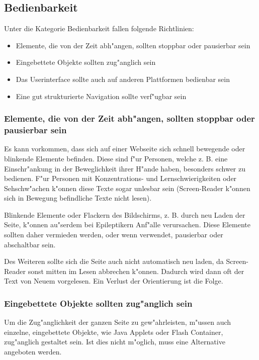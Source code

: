 \documentclass[a4paper,bibtotoc,oneside]{scrbook}
\begin{document}
\subsection{Bedienbarkeit}
Unter die Kategorie Bedienbarkeit fallen folgende Richtlinien: 

\begin{itemize}
\item Elemente, die von der Zeit abh"angen, sollten stoppbar oder pausierbar sein \cite[Abschnitt 6.7]{wcag1}
\item Eingebettete Objekte sollten zug"anglich sein\cite[Abschnitt 6.8]{wcag1}
\item Das Userinterface sollte auch auf anderen Plattformen bedienbar sein\cite[Abschnitt 6.9]{wcag1}
\item Eine gut strukturierte Navigation sollte verf"ugbar sein\cite[Abschnitt 6.13]{wcag1}
\end{itemize}

\subsubsection{Elemente, die von der Zeit abh"angen, sollten stoppbar oder pausierbar sein}
Es kann vorkommen, dass sich auf einer Webseite sich schnell bewegende oder blinkende Elemente befinden. Diese sind f"ur Personen, welche z. B. eine Einschr"ankung in der Beweglichkeit ihrer H"ande haben, besonders schwer zu bedienen. F"ur Personen mit Konzentrations- und Lernschwierigkeiten oder Sehschw"achen k"onnen diese Texte sogar unlesbar sein (Screen-Reader k"onnen sich in Bewegung befindliche Texte nicht lesen). \cite[Abschnitt 6.7]{wcag1}

Blinkende Elemente oder Flackern des Bildschirms, z. B. durch neu Laden der Seite, k"onnen au"serdem bei Epileptikern Anf"alle verursachen.
Diese Elemente sollten daher vermieden werden, oder wenn verwendet, pausierbar oder abschaltbar sein. \cite[S. 45]{barr_webd}

Des Weiteren sollte sich die Seite auch nicht automatisch neu laden, da Screen-Reader sonst mitten im Lesen abbrechen k"onnen. Dadurch wird dann oft der Text von Neuem vorgelesen. Ein Verlust der Orientierung ist die Folge. \cite[S. 45]{barr_webd}

\subsubsection{Eingebettete Objekte sollten zug"anglich sein}
Um die Zug"anglichkeit der ganzen Seite zu gew"ahrleisten, m"ussen auch einzelne, eingebettete Objekte, wie Java Applets oder Flash Container, zug"anglich gestaltet sein. Ist dies nicht m"oglich, muss eine Alternative angeboten werden. \cite[Abschnitt 6.8]{wcag1}
\end{document}
